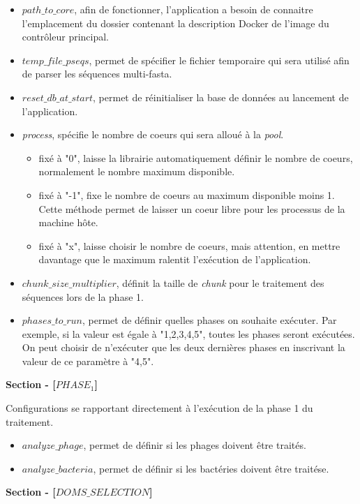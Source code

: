 \begin{itemize}
\item \emph{$path\_to\_core$}, afin de fonctionner, l'application a besoin de connaitre l'emplacement du dossier contenant la description Docker de l'image du contrôleur principal.
\item \emph{$temp\_file\_pseqs$}, permet de spécifier le fichier temporaire qui sera utilisé afin de parser les séquences multi-fasta. 
\item \emph{$reset\_db\_at\_start$}, permet de réinitialiser la base de données au lancement de l'application.
\item \emph{process}, spécifie le nombre de coeurs qui sera alloué à la \emph{pool}. 
\begin{itemize}
\item fixé à "0", laisse la librairie automatiquement définir le nombre de coeurs, normalement le nombre maximum disponible.
\item fixé à "-1", fixe le nombre de coeurs au maximum disponible moins 1. Cette méthode permet de laisser un coeur libre pour les processus de la machine hôte.
\item fixé à "x", laisse choisir le nombre de coeurs, mais attention, en mettre davantage que le maximum ralentit l'exécution de l'application.
\end{itemize}
\item \emph{$chunk\_size\_multiplier$}, définit la taille de \emph{chunk} pour le traitement des séquences lors de la phase 1.
\item \emph{$phases\_to\_run$}, permet de définir quelles phases on souhaite exécuter. Par exemple, si la valeur est égale à "1,2,3,4,5", toutes les phases seront exécutées. On peut choisir de n'exécuter que les deux dernières phases en inscrivant la valeur de ce paramètre à "4,5".
\end{itemize}

\textbf{Section - [$PHASE_1$]}

Configurations se rapportant directement à l'exécution de la phase 1 du traitement.

\begin{itemize}
\item \emph{$analyze\_phage$}, permet de définir si les phages doivent être traités.
\item \emph{$analyze\_bacteria$}, permet de définir si les bactéries doivent être traitése.
\end{itemize}

\textbf{Section - [$DOMS\_SELECTION$]}

